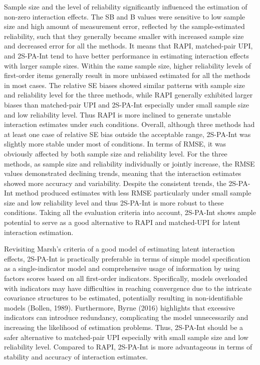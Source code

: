 \documentclass[
  man]{apa6}
\begin{document}
Sample size and the level of reliability significantly influenced the estimation of non-zero interaction effects. The SB and B values were sensitive to low sample size and high amount of measurement error, reflected by the sample-estimated reliability, such that they generally became smaller with increased sample size and decreased error for all the methods. It means that RAPI, matched-pair UPI, and 2S-PA-Int tend to have better performance in estimating interaction effects with larger sample sizes. Within the same sample size, higher reliability levels of first-order items generally result in more unbiased estimated for all the methods in most cases. The relative SE biases showed similar patterns with sample size and reliability level for the three methods, while RAPI generally exhibited larger biases than matched-pair UPI and 2S-PA-Int especially under small sample size and low reliability level. Thus RAPI is more inclined to generate unstable interaction estimates under such conditions. Overall, although three methods had at least one case of relative SE bias outside the acceptable range, 2S-PA-Int was slightly more stable under most of conditions. In terms of RMSE, it was obviously affected by both sample size and reliability level. For the three methods, as sample size and reliability individually or jointly increase, the RMSE values demonstrated declining trends, meaning that the interaction estimates showed more accuracy and variability. Despite the consistent trends, the 2S-PA-Int method produced estimates with less RMSE particularly under small sample size and low reliability level and thus 2S-PA-Int is more robust to these conditions. Taking all the evaluation criteria into account, 2S-PA-Int shows ample potential to serve as a good alternative to RAPI and matched-UPI for latent interaction estimation.

Revisiting Marsh's criteria of a good model of estimating latent interaction effects, 2S-PA-Int is practically preferable in terms of simple model specification as a single-indicator model and comprehensive usage of information by using factors scores based on all first-order indicators. Specifically, models overloaded with indicators may have difficulties in reaching convergence due to the intricate covariance structures to be estimated, potentially resulting in non-identifiable models (Bollen, 1989). Furthermore, Byrne (2016) highlights that excessive indicators can introduce redundancy, complicating the model unnecessarily and increasing the likelihood of estimation problems. Thus, 2S-PA-Int should be a safer alternative to matched-pair UPI especially with small sample size and low reliability level. Compared to RAPI, 2S-PA-Int is more advantageous in terms of stability and accuracy of interaction estimates.
\end{document}
